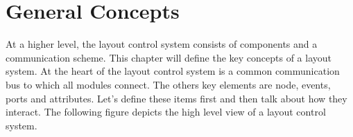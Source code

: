 %
%
%
\chapter*{General Concepts}

At a higher level, the layout control system consists of components and a communication scheme. This chapter will define the key concepts of a layout system. At the heart of the layout control system is a common communication bus to which all modules connect. The others key elements are node, events, ports and attributes. Let's define these items first and then talk about how they interact. The following figure depicts the high level view of a layout control system.

